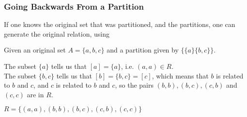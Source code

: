 \documentclass[../notes.tex]{subfiles}
\begin{document}
				\subsubsection{Going Backwards From a Partition}
					If one knows the original set that was partitioned, and the partitions, one can generate the original relation, using 
					\begin{example}
						Given an original set $A = \{a, b, c\}$ and a partition given by $\bigl\{\{a\} \{b, c\}\bigr\}$.
						\begin{indentparagraph}
							The subset $\{a\}$ tells us that $[a] = \{a\}$, i.e. $(a, a) \in R$.\\
							The subset $\{b, c\}$ tells us that $[b] = \{b, c\} = [c]$, which means that $b$ is related to $b$ and $c$, and $c$ is related to $b$ and $c$, so the pairs $(b, b), (b, c), (c, b)$ and $(c, c)$ are in $R$.
						\end{indentparagraph}
						$R = \bigl\{(a, a), (b, b), (b, c), (c, b), (c, c)\bigr\}$
					\end{example}
					\pagebreak
\end{document}
